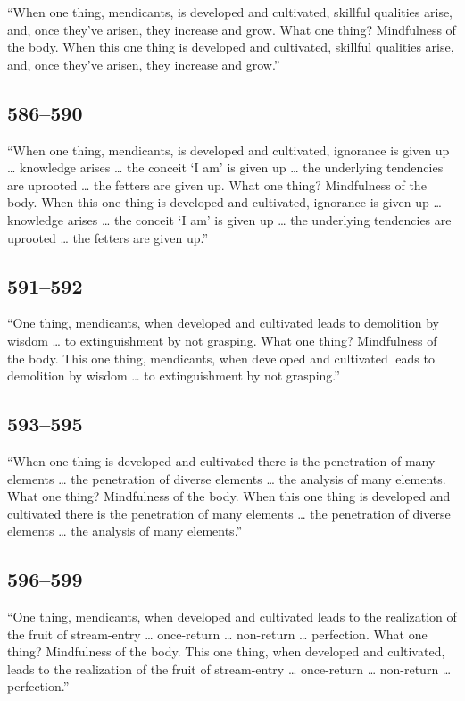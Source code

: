 \documentclass[12pt,openany]{book}%
\begin{document}
“When one thing, mendicants, is developed and cultivated, skillful qualities arise, and, once they’ve arisen, they increase and grow. What one thing? Mindfulness of the body. When this one thing is developed and cultivated, skillful qualities arise, and, once they’ve arisen, they increase and grow.” 

\subsection*{586–590 }

“When one thing, mendicants, is developed and cultivated, ignorance is given up … knowledge arises … the conceit ‘I am’ is given up … the underlying tendencies are uprooted … the fetters are given up. What one thing? Mindfulness of the body. When this one thing is developed and cultivated, ignorance is given up … knowledge arises … the conceit ‘I am’ is given up … the underlying tendencies are uprooted … the fetters are given up.” 

\subsection*{591–592 }

“One thing, mendicants, when developed and cultivated leads to demolition by wisdom … to extinguishment by not grasping. What one thing? Mindfulness of the body. This one thing, mendicants, when developed and cultivated leads to demolition by wisdom … to extinguishment by not grasping.” 

\subsection*{593–595 }

“When one thing is developed and cultivated there is the penetration of many elements … the penetration of diverse elements … the analysis of many elements. What one thing? Mindfulness of the body. When this one thing is developed and cultivated there is the penetration of many elements … the penetration of diverse elements … the analysis of many elements.” 

\subsection*{596–599 }

“One thing, mendicants, when developed and cultivated leads to the realization of the fruit of stream-entry … once-return … non-return … perfection. What one thing? Mindfulness of the body. This one thing, when developed and cultivated, leads to the realization of the fruit of stream-entry … once-return … non-return … perfection.” 
\end{document}
